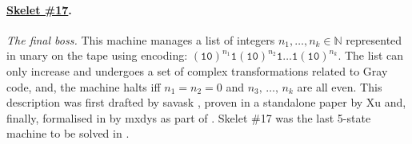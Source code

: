 \vspace{-0.5em}
\paragraph{\href{https://bbchallenge.org/1RB---_0LC1RE_0LD1LC_1RA1LB_0RB0RA}{Skelet \#17}.} \textit{The final boss.} This machine manages a list of integers $n_1, \dots, n_k \in \mathbb{N}$ represented in unary on the tape using encoding: $(\texttt{10})^{n_1} \texttt{1} (\texttt{10})^{n_2} \texttt{1} \dots \texttt{1} (\texttt{10})^{n_k}$. The list can only increase and undergoes a set of complex transformations related to Gray code, and, the machine halts iff $n_1 = n_2 = 0$ and $n_3,\, \dots,\, n_k$ are all even. This description was first drafted by savask \cite{savaskSk17}, proven in a standalone paper by Xu \cite{xu2024skelet17fifthbusy} and, finally, formalised in \Coq by mxdys as part of \CoqBB. Skelet \#17 was the last 5-state machine to be solved in \Coq.
